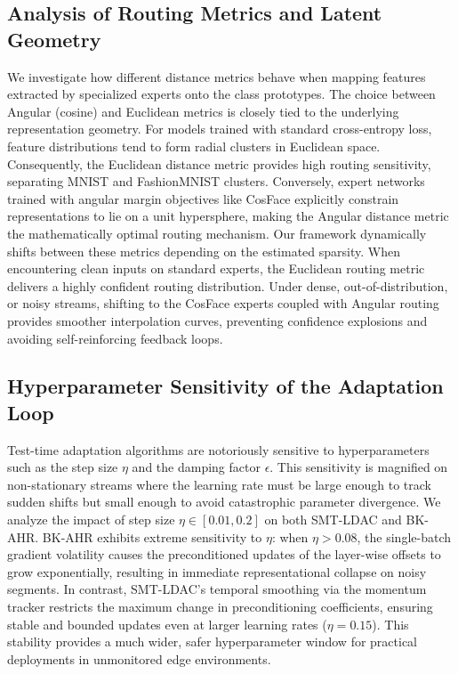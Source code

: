 \documentclass{article}
\theoremstyle{plain}
\theoremstyle{definition}
\theoremstyle{remark}
\begin{document}


\subsection{Analysis of Routing Metrics and Latent Geometry}
We investigate how different distance metrics behave when mapping features extracted by specialized experts onto the class prototypes. The choice between Angular (cosine) and Euclidean metrics is closely tied to the underlying representation geometry. For models trained with standard cross-entropy loss, feature distributions tend to form radial clusters in Euclidean space. Consequently, the Euclidean distance metric provides high routing sensitivity, separating MNIST and FashionMNIST clusters. Conversely, expert networks trained with angular margin objectives like CosFace \cite{wang2018cosface} explicitly constrain representations to lie on a unit hypersphere, making the Angular distance metric the mathematically optimal routing mechanism. Our framework dynamically shifts between these metrics depending on the estimated sparsity. When encountering clean inputs on standard experts, the Euclidean routing metric delivers a highly confident routing distribution. Under dense, out-of-distribution, or noisy streams, shifting to the CosFace experts coupled with Angular routing provides smoother interpolation curves, preventing confidence explosions and avoiding self-reinforcing feedback loops.

\subsection{Hyperparameter Sensitivity of the Adaptation Loop}
Test-time adaptation algorithms are notoriously sensitive to hyperparameters such as the step size $\eta$ and the damping factor $\epsilon$. This sensitivity is magnified on non-stationary streams where the learning rate must be large enough to track sudden shifts but small enough to avoid catastrophic parameter divergence. We analyze the impact of step size $\eta \in [0.01, 0.2]$ on both SMT-LDAC and BK-AHR. BK-AHR exhibits extreme sensitivity to $\eta$: when $\eta > 0.08$, the single-batch gradient volatility causes the preconditioned updates of the layer-wise offsets to grow exponentially, resulting in immediate representational collapse on noisy segments. In contrast, SMT-LDAC's temporal smoothing via the momentum tracker restricts the maximum change in preconditioning coefficients, ensuring stable and bounded updates even at larger learning rates ($\eta = 0.15$). This stability provides a much wider, safer hyperparameter window for practical deployments in unmonitored edge environments.
\end{document}
